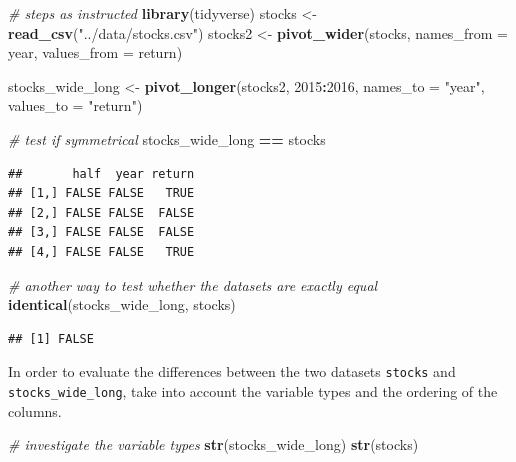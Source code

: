 \documentclass[
]{article}
\newenvironment{Shaded}{\begin{snugshade}}{\end{snugshade}}
\newcommand{\CommentTok}[1]{\textcolor[rgb]{0.56,0.35,0.01}{\textit{#1}}}
\newcommand{\DataTypeTok}[1]{\textcolor[rgb]{0.13,0.29,0.53}{#1}}
\newcommand{\KeywordTok}[1]{\textcolor[rgb]{0.13,0.29,0.53}{\textbf{#1}}}
\newcommand{\NormalTok}[1]{#1}
\newcommand{\OperatorTok}[1]{\textcolor[rgb]{0.81,0.36,0.00}{\textbf{#1}}}
\newcommand{\StringTok}[1]{\textcolor[rgb]{0.31,0.60,0.02}{#1}}
\begin{document}
\begin{Shaded}
\begin{Highlighting}[]
\CommentTok{\# steps as instructed}
\KeywordTok{library}\NormalTok{(tidyverse)}
\NormalTok{stocks \textless{}{-}}\StringTok{ }\KeywordTok{read\_csv}\NormalTok{(}\StringTok{"../data/stocks.csv"}\NormalTok{)}
\NormalTok{stocks2 \textless{}{-}}\StringTok{ }\KeywordTok{pivot\_wider}\NormalTok{(stocks, }\DataTypeTok{names\_from =}\NormalTok{ year, }\DataTypeTok{values\_from =}\NormalTok{ return)}

\NormalTok{stocks\_wide\_long \textless{}{-}}\StringTok{ }\KeywordTok{pivot\_longer}\NormalTok{(stocks2, }\StringTok{\textasciigrave{}}\DataTypeTok{2015}\StringTok{\textasciigrave{}}\OperatorTok{:}\StringTok{\textasciigrave{}}\DataTypeTok{2016}\StringTok{\textasciigrave{}}\NormalTok{, }\DataTypeTok{names\_to =} \StringTok{"year"}\NormalTok{, }
                                 \DataTypeTok{values\_to =} \StringTok{"return"}\NormalTok{) }

\CommentTok{\# test if symmetrical}
\NormalTok{stocks\_wide\_long }\OperatorTok{==}\StringTok{ }\NormalTok{stocks}
\end{Highlighting}
\end{Shaded}

\begin{verbatim}
##       half  year return
## [1,] FALSE FALSE   TRUE
## [2,] FALSE FALSE  FALSE
## [3,] FALSE FALSE  FALSE
## [4,] FALSE FALSE   TRUE
\end{verbatim}

\begin{Shaded}
\begin{Highlighting}[]
\CommentTok{\# another way to test whether the datasets are exactly equal}
\KeywordTok{identical}\NormalTok{(stocks\_wide\_long, stocks)}
\end{Highlighting}
\end{Shaded}

\begin{verbatim}
## [1] FALSE
\end{verbatim}

In order to evaluate the differences between the two datasets
\texttt{stocks} and \texttt{stocks\_wide\_long}, take into account the
variable types and the ordering of the columns.

\begin{Shaded}
\begin{Highlighting}[]
\CommentTok{\# investigate the variable types}
\KeywordTok{str}\NormalTok{(stocks\_wide\_long)}
\KeywordTok{str}\NormalTok{(stocks)}
\end{Highlighting}
\end{Shaded}
\end{document}
